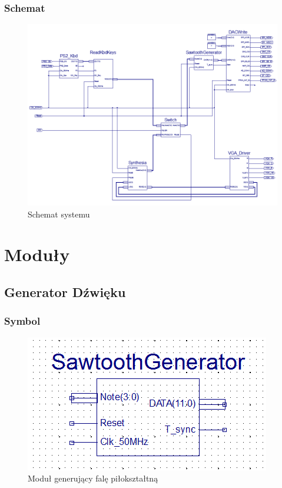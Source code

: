 \documentclass[a4paper]{report}
\begin{document}
		\begin{landscape}
			\subsection{Schemat}
				\begin{figure}[h!]
					\centering
					\includegraphics[width=1.1\textwidth]{schemat.png}
					\caption{Schemat systemu}
				\end{figure}
		\end{landscape}

\chapter{Moduły}
	\section{Generator Dźwięku}
		\subsection{Symbol}
			\begin{figure}[h!]
				\centering
				\includegraphics{sawtoothgenerator2.png}
				\caption{Moduł generujący falę piłokształtną}
			\end{figure}
			\vspace{15pt}
\end{document}
